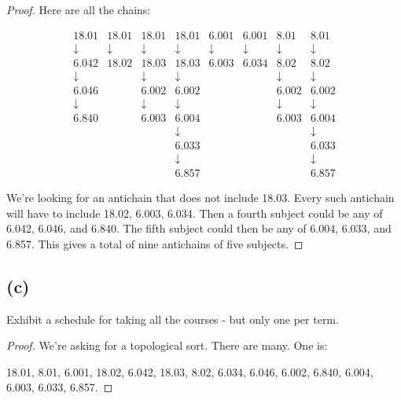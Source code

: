 \documentclass[14pt]{extarticle}
\begin{document}
\begin{proof}
Here are all the chains:

$$
\begin{array}{cccccccc}
18.01 & 18.01 & 18.01 & 18.01 & 6.001 & 6.001 & 8.01 & 8.01 \\
\downarrow & \downarrow  & \downarrow & \downarrow & \downarrow & \downarrow & \downarrow & \downarrow \\
6.042 & 18.02 & 18.03 & 18.03 & 6.003 & 6.034 & 8.02 & 8.02 \\
\downarrow &   & \downarrow & \downarrow & & & \downarrow & \downarrow \\
6.046 & & 6.002 & 6.002 & & & 6.002 & 6.002 \\
\downarrow &   & \downarrow & \downarrow & & & \downarrow & \downarrow \\
6.840 & & 6.003 & 6.004 & & & 6.003 & 6.004 \\
& &  & \downarrow &  &  &  & \downarrow \\
& & & 6.033 & & & & 6.033\\
& & & \downarrow &  &  &  & \downarrow \\
& & & 6.857 & & & & 6.857
\end{array}
$$

We're looking for an antichain that does not include 18.03. Every such antichain will have to include 18.02, 6.003, 6.034. Then a fourth subject could be any of 6.042, 6.046, and 6.840. The fifth subject could then be any of 6.004, 6.033, and 6.857. This gives a total of nine antichains of five subjects.
\end{proof}

\subsection{(c)}
Exhibit a schedule for taking all the courses - but only one per term.
\begin{proof}
We're asking for a topological sort. There are many. One is: 

18.01, 8.01, 6.001, 18.02, 6.042, 18.03, 8.02, 6.034, 6.046, 6.002, 6.840, 6.004, 6.003, 6.033, 6.857.
\end{proof}
\end{document}
